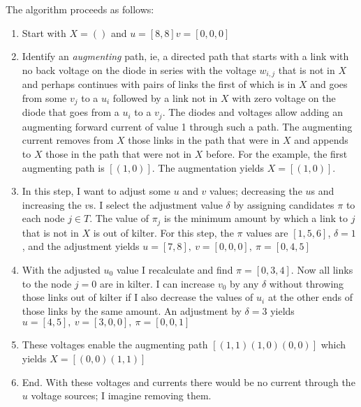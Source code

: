 \documentclass[12pt]{article}
\begin{document}
The algorithm proceeds as follows:
\begin{enumerate}
\item Start with $X=()$ and $u= [ 8,  8] v= [ 0,  0,  0] $
\item Identify an \emph{augmenting} path, ie, a directed path that
  starts with a link with no back voltage on the diode in series with
  the voltage $w_{i,j}$ that is not in $X$ and perhaps continues with
  pairs of links the first of which is in $X$ and goes from some $v_j$
  to a $u_i$ followed by a link not in $X$ with zero voltage on the
  diode that goes from a $u_i$ to a $v_j$.  The diodes and voltages
  allow adding an augmenting forward current of value 1 through such a
  path.  The augmenting current removes from $X$ those links in the
  path that were in $X$ and appends to $X$ those in the path that were
  not in $X$ before.  For the example, the first augmenting path is
  $[(1,0)]$.  The augmentation yields $X=[(1,0)]$.
\item In this step, I want to adjust some $u$ and $v$ values;
  decreasing the $u$s and increasing the $v$s.  I select the
  adjustment value $\delta$ by assigning candidates $\pi$ to each
  node $j\in T$.  The value of $\pi_j$ is the minimum amount by which a
  link to $j$ that is not in $X$ is out of kilter.  For this step, the
  $\pi$ values are $[ 1, 5, 6]$, $\delta=1$, and the adjustment yields
  $u= [ 7, 8],~ v= [ 0, 0, 0],~ \pi= [ 0, 4, 5]$
\item With the adjusted $u_0$ value I recalculate and find
  $\pi=[0,3,4]$.  Now all links to the node $j=0$ are in kilter.  I
  can increase $v_0$ by any $\delta$ without throwing those links out
  of kilter if I also decrease the values of $u_i$ at the other ends
  of those links by the same amount.  An adjustment by $\delta=3$
  yields $u= [ 4, 5],~ v= [ 3, 0, 0],~ \pi= [ 0, 0, 1]$
\item These voltages enable the augmenting path $[(1,1) (1,0) (0,0)]$
  which yields $X= [(0, 0) (1, 1)]$
\item End.  With these voltages and currents there would be no current
  through the $u$ voltage sources; I imagine removing them.
\end{enumerate}
\end{document}
